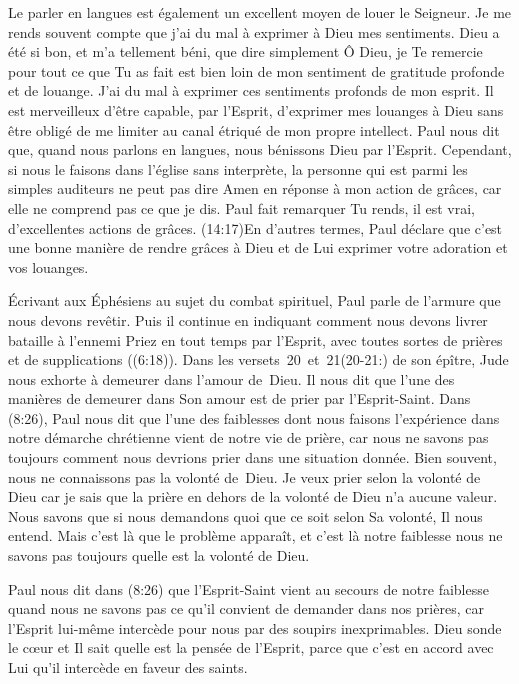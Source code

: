 Le parler en langues est également un excellent moyen de louer le Seigneur.
 Je me rends souvent compte que j'ai du mal à exprimer à Dieu mes sentiments.
 Dieu a été si bon, et m'a tellement béni, que dire simplement\frcolon{}
 \Og Ô Dieu, je Te remercie pour tout ce que Tu as fait \Fg{}
 est bien loin de mon sentiment de gratitude profonde et de louange.
 J'ai du mal à exprimer ces sentiments profonds de mon esprit.
 Il est merveilleux d'être capable, par l'Esprit, d'exprimer mes louanges
 à Dieu sans être obligé de me limiter au canal étriqué
 de mon propre intellect. Paul nous dit que, quand nous parlons en langues,
 nous bénissons Dieu par l'Esprit. Cependant, si nous le faisons
 dans l'église sans interprète, la personne qui est parmi les simples auditeurs
 ne peut pas dire \Og Amen \Fg{} en réponse à mon action de grâces,
 car elle ne comprend pas ce que je dis. Paul fait remarquer\frcolon{}
 \Og Tu rends, il est vrai, d'excellentes actions de grâces. \Fg{}
 (14:17)En d'autres termes,
 Paul déclare que c'est une bonne manière
 de rendre grâces à Dieu et de Lui exprimer votre adoration et vos louanges.

Écrivant aux Éphésiens au sujet du combat spirituel, Paul parle de l'armure
 que nous devons revêtir. Puis il continue en indiquant comment
 nous devons livrer bataille à l'ennemi\frcolon{}
 \Og Priez en tout temps par l'Esprit, avec toutes sortes de prières
 et de supplications \Fg{} ((6:18)).
 Dans les versets~20~et~21(20-21:) de son épître,
 Jude nous exhorte à demeurer dans l'amour de~Dieu.
 Il nous dit que l'une des manières de demeurer dans Son amour est de prier
 par l'Esprit-Saint. Dans (8:26), Paul nous dit que l'une
 des faiblesses dont nous faisons l'expérience 
 dans notre démarche
 chrétienne vient de notre vie de prière, car nous ne savons pas toujours
 comment nous devrions prier dans une situation donnée.
 Bien souvent, nous ne connaissons pas la volonté de~Dieu.
 Je veux prier selon la volonté de Dieu car je sais que la prière en dehors
 de la volonté de Dieu n'a aucune valeur. Nous savons que si nous demandons
 quoi que ce soit selon Sa volonté, Il nous entend.
 Mais c'est là que le problème apparaît, et c'est là notre faiblesse\frcolon{}
 nous ne savons pas toujours quelle est la volonté de Dieu.

Paul nous dit dans (8:26) que l'Esprit-Saint vient au secours
 de notre faiblesse quand nous ne savons pas ce qu'il convient de demander dans nos prières,
 car l'Esprit lui-même intercède pour nous par des soupirs inexprimables.
 Dieu sonde le cœur et Il sait quelle est la pensée de l'Esprit,
 parce que c'est en accord avec Lui qu'il intercède en faveur des saints.

